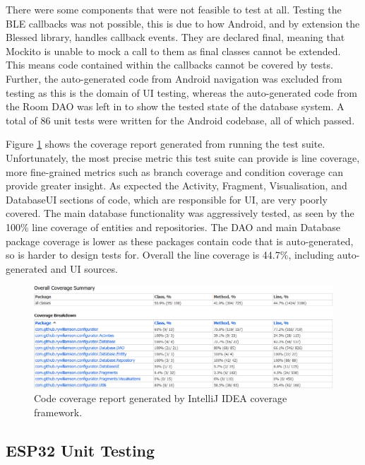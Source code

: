 \documentclass{l4proj}
\begin{document}
There were some components that were not feasible to test at all. Testing the BLE callbacks was not possible, this is due to how Android, and by extension the Blessed library, handles callback events. They are declared final, meaning that Mockito is unable to mock a call to them as final classes cannot be extended. This means code contained within the callbacks cannot be covered by tests. Further, the auto-generated code from Android navigation was excluded from testing as this is the domain of UI testing, whereas the auto-generated code from the Room DAO was left in to show the tested state of the database system. A total of 86 unit tests were written for the Android codebase, all of which passed.

Figure \ref{fig:android_coverage} shows the coverage report generated from running the test suite. Unfortunately, the most precise metric this test suite can provide is line coverage, more fine-grained metrics such as branch coverage and condition coverage can provide greater insight. As expected the Activity, Fragment, Visualisation, and DatabaseUI sections of code, which are responsible for UI, are very poorly covered. The main database functionality was aggressively tested, as seen by the 100\% line coverage of entities and repositories. The DAO and main Database package coverage is lower as these packages contain code that is auto-generated, so is harder to design tests for. Overall the line coverage is 44.7\%, including auto-generated and UI sources.

\begin{figure}[!htb]
    \centering
    \includegraphics[width=1.0\linewidth]{images/android-code-coverage.png}

    \caption{ Code coverage report generated by IntelliJ IDEA coverage framework. }

    \label{fig:android_coverage}
\end{figure}

\subsection{ESP32 Unit Testing}
\end{document}
